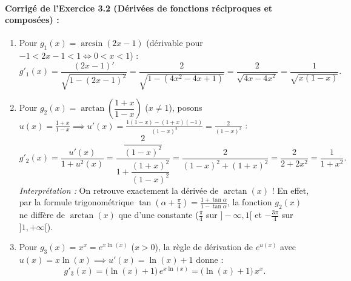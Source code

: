 \paragraph{Corrigé de l'Exercice 3.2 (Dérivées de fonctions réciproques et composées) :}
\begin{enumerate}[label=(\alph*)]
    \item Pour $g_1(x) = \arcsin(2x-1)$ (dérivable pour $-1 < 2x-1 < 1 \iff 0 < x < 1$) :
    \[
        g'_1(x) = \frac{(2x-1)'}{\sqrt{1 - (2x-1)^2}} = \frac{2}{\sqrt{1 - (4x^2 - 4x + 1)}} = \frac{2}{\sqrt{4x - 4x^2}} = \boxed{\frac{1}{\sqrt{x(1 - x)}}}.
    \]
    \item Pour $g_2(x) = \arctan\left(\dfrac{1+x}{1-x}\right)$ ($x \neq 1$), posons $u(x) = \frac{1+x}{1-x} \implies u'(x) = \frac{1(1-x) - (1+x)(-1)}{(1-x)^2} = \frac{2}{(1-x)^2}$ :
    \[
        g'_2(x) = \frac{u'(x)}{1 + u^2(x)} = \frac{\dfrac{2}{(1-x)^2}}{1 + \dfrac{(1+x)^2}{(1-x)^2}} = \frac{2}{(1-x)^2 + (1+x)^2} = \frac{2}{2 + 2x^2} = \boxed{\frac{1}{1 + x^2}}.
    \]
    \emph{Interprétation :} On retrouve exactement la dérivée de $\arctan(x)$ ! En effet, par la formule trigonométrique $\tan\left(\alpha + \frac{\pi}{4}\right) = \frac{1 + \tan\alpha}{1 - \tan\alpha}$, la fonction $g_2(x)$ ne diffère de $\arctan(x)$ que d'une constante ($\frac{\pi}{4}$ sur $]-\infty, 1[$ et $-\frac{3\pi}{4}$ sur $]1, +\infty[$).
    \item Pour $g_3(x) = x^x = e^{x\ln(x)}$ ($x > 0$), la règle de dérivation de $e^{u(x)}$ avec $u(x) = x\ln(x) \implies u'(x) = \ln(x) + 1$ donne :
    \[
        \boxed{g'_3(x) = \bigl(\ln(x) + 1\bigr)\,e^{x\ln(x)} = \bigl(\ln(x) + 1\bigr)\,x^x}.
    \]
\end{enumerate}

